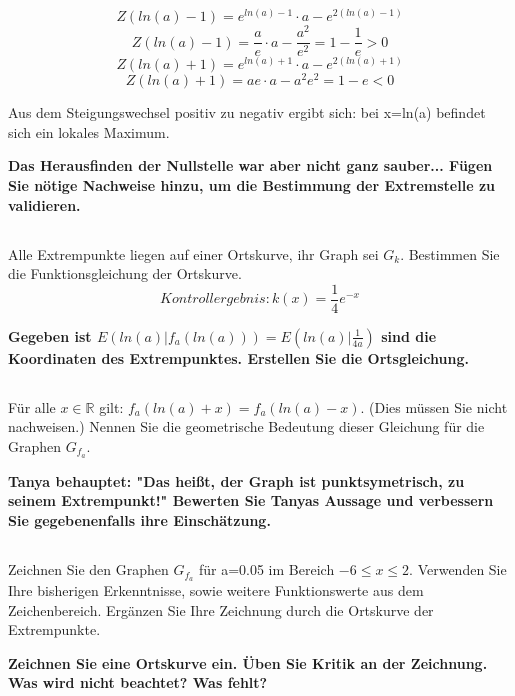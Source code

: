 \documentclass{article}
\begin{document}
\[Z(ln(a)-1)= e^{ln(a)-1} \cdot a - e^{2(ln(a)-1)}\]
\[Z(ln(a)-1)= \frac{a}{e} \cdot a - \frac{a^2}{e^2} = 1-\frac{1}{e} > 0\]
\[Z(ln(a)+1)= e^{ln(a)+1} \cdot a - e^{2(ln(a)+1)}\]
\[Z(ln(a)+1)= ae \cdot a - a^2e^2 = 1-e < 0\]

Aus dem Steigungswechsel positiv zu negativ ergibt sich: bei x=ln(a) befindet sich ein lokales Maximum.

\textbf{Das Herausfinden der Nullstelle war aber nicht ganz sauber... Fügen Sie nötige Nachweise hinzu, um die Bestimmung der Extremstelle zu validieren.}

\subsection{}

Alle Extrempunkte liegen auf einer Ortskurve, ihr Graph sei $ G_k $.
Bestimmen Sie die Funktionsgleichung der Ortskurve.
\[Kontrollergebnis: k(x)=\frac{1}{4}e^{-x}\]

\textbf{Gegeben ist $E (ln(a)|f_a(ln(a))) = E (ln(a)|\frac{1}{4a})$ sind die Koordinaten des Extrempunktes. Erstellen Sie die Ortsgleichung.}

\subsection{}

Für alle $ x \in \mathbb{R}$ gilt: $f_a(ln(a)+x)=f_a(ln(a)-x)$. (Dies müssen Sie nicht nachweisen.)
Nennen Sie die geometrische Bedeutung dieser Gleichung für die Graphen $G_{f_a}$.

\textbf{Tanya behauptet: "Das heißt, der Graph ist punktsymetrisch, zu seinem Extrempunkt!" Bewerten Sie Tanyas Aussage und verbessern Sie gegebenenfalls ihre Einschätzung.}

\subsection{}

Zeichnen Sie den Graphen $G_{f_a}$ für a=0.05 im Bereich $-6 \leq x \leq 2$. Verwenden Sie Ihre bisherigen Erkenntnisse, sowie weitere Funktionswerte aus dem Zeichenbereich. Ergänzen Sie Ihre Zeichnung durch die Ortskurve der Extrempunkte.


\textbf{Zeichnen Sie eine Ortskurve ein. Üben Sie Kritik an der Zeichnung. Was wird nicht beachtet? Was fehlt?}
\end{document}
